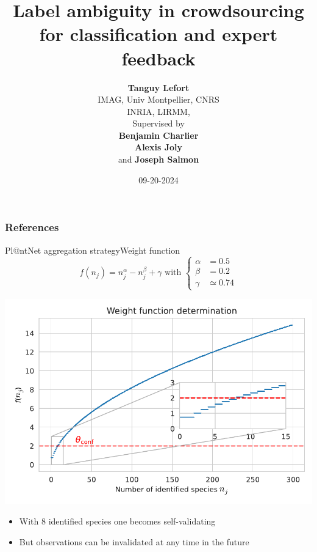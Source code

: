 \documentclass[10pt,aspectratio=43,unknownkeysallowed]{beamer}
\title[] %
{
    Label ambiguity in crowdsourcing \\ for classification and
    expert feedback} %
\date{09-20-2024} %
\author[]%
{%
    {\textbf{Tanguy Lefort}\\ IMAG, Univ Montpellier, CNRS \\ INRIA, LIRMM,}%
    \vspace{1cm}\\
    {Supervised by\\ \hspace{.5cm} \textbf{Benjamin Charlier} \\ \hspace{.5cm} \textbf{Alexis Joly} \\ \hspace{.5cm} and \textbf{Joseph Salmon}}%
}
\institute[
]
{%
}
\begin{document}
\maketitle


\begin{frame}
    \frametitle{References}
    \footnotesize
    \printbibliography
\end{frame}

\appendix

\begin{frame}{Pl@ntNet aggregation strategy}{Weight function}
\[f(n_j)=n_j^\alpha -n_j^\beta + \gamma \text{ with }\begin{cases} \alpha&=0.5 \\ \beta &=0.2 \\ \gamma&\simeq 0.74\end{cases}\]

\begin{center}
    \includegraphics[width=.6\textwidth]{../chapters/images_plantnet/weight_function.pdf}
\end{center}

\begin{itemize}
    \item With 8 identified species one becomes self-validating
    \item<2> But observations can be invalidated at any time in the future
\end{itemize}
\end{frame}
\end{document}
